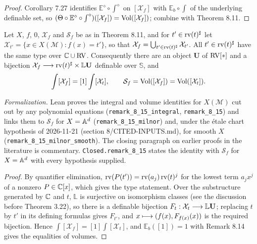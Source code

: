 \begin{proof}
\leanok
Corollary 7.27 identifies $\mathbb E^\diamond \circ \int^\diamond$ on $[\mathcal X_f]$ with $\mathbb E_b \circ \int$ of the underlying definable set, so $(\Theta \circ \mathbb E^\diamond \circ \int^\diamond)([\mathcal X_f]) = \operatorname{Vol}([\mathcal X_f])$; combine with Theorem 8.11.
\end{proof}

\setcounter{theorem}{14}
\begin{remark}
\label{rem-comp-milnor-fib-bis}
\leanok
{}
Let $X$, $f$, $0$, $\mathcal X_f$ and $\mathcal S_f$ be as in Theorem 8.11, and for $t' \in \operatorname{rv}(t)^\sharp$ let $\mathcal X_{t'} = \{x \in X(\mathcal M) : f(x) = t'\}$, so that $\mathcal X_f = \bigcup_{t' \in \operatorname{rv}(t)^\sharp} \mathcal X_{t'}$. All $t' \in \operatorname{rv}(t)^\sharp$ have the same type over $\mathbb{C} \cup \mathrm{RV}$. Consequently there are an object $\mathbf U$ of $\mathrm{RV}[*]$ and a bijection $\mathcal X_f \longrightarrow \operatorname{rv}(t)^\sharp \times \mathbb L \mathbf U$ definable over $\mathbb S$, and \[ \int [\mathcal X_f] = [1] \int [\mathcal X_t], \qquad \mathcal S_f = \operatorname{Vol}([\mathcal X_f]) = \operatorname{Vol}([\mathcal X_t]). \]

\emph{Formalization.} Lean proves the integral and volume identities for $X(\mathcal M)$ cut out by any polynomial equations (\texttt{remark\_8\_15\_integral}, \texttt{remark\_8\_15}) and links them to $\mathcal S_f$ for $X = \mathbb{A}^d$ (\texttt{remark\_8\_15\_milnor}) and, under the \'etale chart hypothesis of 2026-11-21 (section 8/CITED-INPUTS.md), for smooth $X$ (\texttt{remark\_8\_15\_milnor\_smooth}). The closing paragraph on earlier proofs in the literature is commentary. \texttt{Closed.remark\_8\_15} states the identity with $\mathcal S_f$ for $X = \mathbb{A}^d$ with every hypothesis supplied.
\end{remark}

\begin{proof}
\leanok
By quantifier elimination, $\operatorname{rv}(P(t')) = \operatorname{rv}(a_j)\operatorname{rv}(t)^j$ for the lowest term $a_j x^j$ of a nonzero $P \in \mathbb{C}[x]$, which gives the type statement. Over the substructure generated by $\mathbb{C}$ and $t$, $\mathbb L$ is surjective on isomorphism classes (see the discussion before Theorem 3.22), so there is a definable bijection $F_t : \mathcal X_t \longrightarrow \mathbb L \mathbf U$; replacing $t$ by $t'$ in its defining formulas gives $F_{t'}$, and $x \longmapsto (f(x), F_{f(x)}(x))$ is the required bijection. Hence $\int[\mathcal X_f] = [1]\int[\mathcal X_t]$, and $\mathbb E_b([1]) = 1$ with Remark 8.14 gives the equalities of volumes.
\end{proof}
